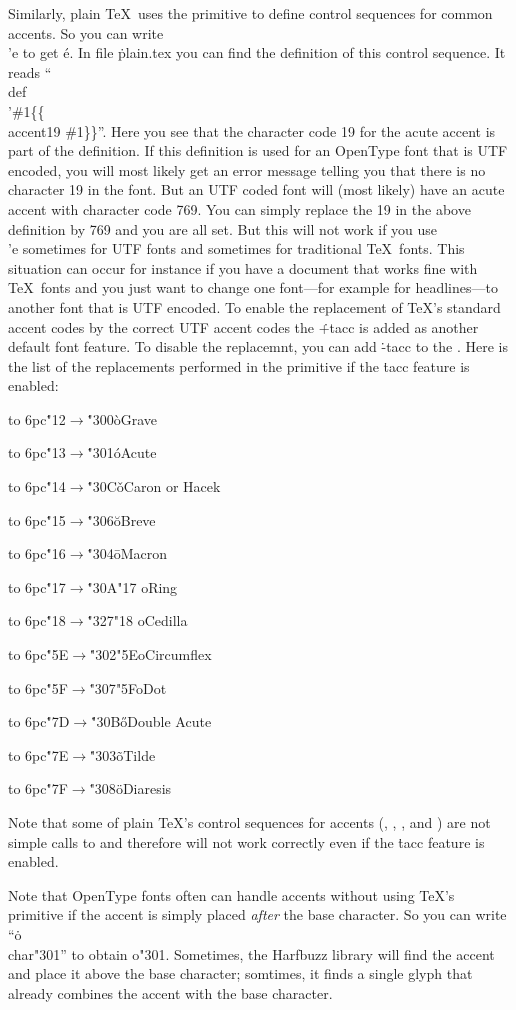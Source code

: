 Similarly, plain \TeX\ uses the  primitive to define control
sequences for common accents. So you can write \.{\\'e} to get \'e.
In file \.{plain.tex} you can find the definition of this control sequence.
It reads ``\.{\\def\\'\#1\{\{\\accent19 \#1\}\}}''. Here you see that the character
code 19 for the acute accent is part of the definition. If this definition is
used for an OpenType font that is UTF encoded, you will most likely get an error message
telling you that there is no character 19 in the font.
But an UTF coded font will (most likely) have an acute accent with character
code 769. You can simply replace the 19 in the above definition by 769 and you are all
set. But this will not work if you use \.{\\'e} sometimes for UTF fonts and sometimes
for traditional \TeX\ fonts. This situation can occur for instance if you have a document
that works fine with \TeX\ fonts and you just want to change one font---for example for
headlines---to another font that is UTF encoded.
To enable the replacement of \TeX's standard accent codes by the correct UTF
accent codes the  \.{+tacc} is added as another default font feature.
To disable the replacemnt, you can add \.{-tacc} to the .
Here is the list of the replacements performed in the  primitive
if the \.{tacc} feature is enabled:
\medskip
{\parindent=0pt\parskip=0pt
\def\showtacc#1#2#3#4{\leavevmode\hangindent=6pc
 \hangafter=1\hbox to 6pc{\.{#1}\hss${}\rightarrow{}$\hss\.{#2}\quad}{\utf#3}\quad#4\par}
\showtacc{"12}{"300}{\`o}{Grave}
\showtacc{"13}{"301}{\'o}{Acute}
\showtacc{"14}{"30C}{\v o}{Caron or Hacek}
\showtacc{"15}{"306}{\u o}{Breve}
\showtacc{"16}{"304}{\= o}{Macron}
\showtacc{"17}{"30A}{\accent"17 o}{Ring}
\showtacc{"18}{"327}{\accent"18 o}{Cedilla}
\showtacc{"5E}{"302}{\accent"5Eo}{Circumflex}
\showtacc{"5F}{"307}{\accent"5Fo}{Dot}
\showtacc{"7D}{"30B}{\H o}{Double Acute}
\showtacc{"7E}{"303}{\~o}{Tilde}
\showtacc{"7F}{"308}{\"o}{Diaresis}
}
\medskip
\itemize
\item Note that some of plain \TeX's control sequences for accents (, , ,
and ) are not simple calls to  and therefore will not work correctly
even if the \.{tacc} feature is enabled.

\item Note that OpenType fonts often can handle accents without
using \TeX's  primitive if the accent is simply placed {\it after}
the base character. So you can write ``\.{o\\char"301}'' to obtain {\lmr o\char"301}.
Sometimes, the Harfbuzz library will find the accent and place it above the base character;
somtimes, it finds a single glyph that already combines the accent with the base character.

